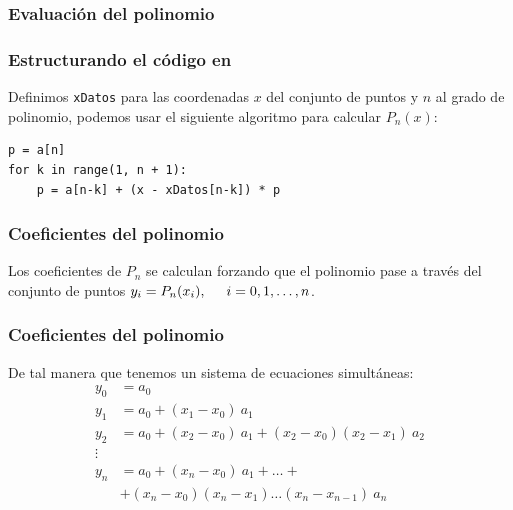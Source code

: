 \begin{frame}
\frametitle{Evaluación del polinomio}
\end{frame}
\begin{frame}[fragile]
\frametitle{Estructurando el código en \python}
Definimos \texttt{xDatos} para las coordenadas $x$ del conjunto de puntos y $n$ al grado de polinomio, podemos usar el siguiente algoritmo para calcular $P_{n}(x)$:
\begin{lstlisting}[caption=Nombre Codigo, style=FormattedNumber, basicstyle=\linespread{1.1}\ttfamily=\small, columns=fullflexible]
p = a[n]
for k in range(1, n + 1):
    p = a[n-k] + (x - xDatos[n-k]) * p
\end{lstlisting}
\end{frame}
\begin{frame}
\frametitle{Coeficientes del polinomio}
Los coeficientes de $P_{n}$ se calculan forzando que el polinomio pase a través del conjunto de puntos $y_{i}=P_{n}(x_{i}),\hspace{0.5cm} i =0,1,\ldots,n$. 
\end{frame}
\begin{frame}
\frametitle{Coeficientes del polinomio}
De tal manera que tenemos un sistema de ecuaciones simultáneas:
\begin{align*}
y_{0} &= a_{0} \\
y_{1} &= a_{0} + (x_{1} - x_{0}) \: a_{1} \\
y_{2} &= a_{0} + (x_{2} - x_{0}) \: a_{1} + (x_{2} - x_{0})(x_{2} - x_{1}) \: a_{2} \\
\vdots \\
y_{n} &= a_{0} + (x_{n} - x_{0}) \: a_{1} + \ldots + \\
       &+ (x_{n} - x_{0})(x_{n} - x_{1}) \ldots (x_{n} - x_{n - 1}) \: a_{n}
\end{align*}
\end{frame}
